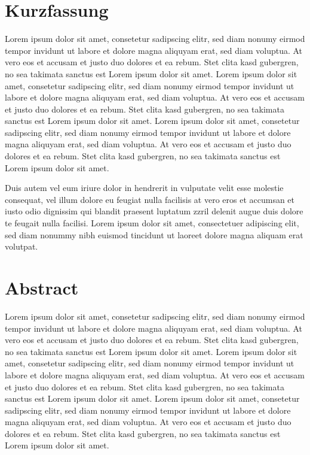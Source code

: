 
\pagestyle{empty}

\chapter*{Kurzfassung}	%
Lorem ipsum dolor sit amet, consetetur sadipscing elitr, sed diam nonumy eirmod tempor invidunt ut labore et dolore magna aliquyam erat, sed diam voluptua. At vero eos et accusam et justo duo dolores et ea rebum. Stet clita kasd gubergren, no sea takimata sanctus est Lorem ipsum dolor sit amet. Lorem ipsum dolor sit amet, consetetur sadipscing elitr, sed diam nonumy eirmod tempor invidunt ut labore et dolore magna aliquyam erat, sed diam voluptua. At vero eos et accusam et justo duo dolores et ea rebum. Stet clita kasd gubergren, no sea takimata sanctus est Lorem ipsum dolor sit amet. Lorem ipsum dolor sit amet, consetetur sadipscing elitr, sed diam nonumy eirmod tempor invidunt ut labore et dolore magna aliquyam erat, sed diam voluptua. At vero eos et accusam et justo duo dolores et ea rebum. Stet clita kasd gubergren, no sea takimata sanctus est Lorem ipsum dolor sit amet.   

Duis autem vel eum iriure dolor in hendrerit in vulputate velit esse molestie consequat, vel illum dolore eu feugiat nulla facilisis at vero eros et accumsan et iusto odio dignissim qui blandit praesent luptatum zzril delenit augue duis dolore te feugait nulla facilisi. Lorem ipsum dolor sit amet, consectetuer adipiscing elit, sed diam nonummy nibh euismod tincidunt ut laoreet dolore magna aliquam erat volutpat.   

\newpage
\chapter*{Abstract} %
Lorem ipsum dolor sit amet, consetetur sadipscing elitr, sed diam nonumy eirmod tempor invidunt ut labore et dolore magna aliquyam erat, sed diam voluptua. At vero eos et accusam et justo duo dolores et ea rebum. Stet clita kasd gubergren, no sea takimata sanctus est Lorem ipsum dolor sit amet. Lorem ipsum dolor sit amet, consetetur sadipscing elitr, sed diam nonumy eirmod tempor invidunt ut labore et dolore magna aliquyam erat, sed diam voluptua. At vero eos et accusam et justo duo dolores et ea rebum. Stet clita kasd gubergren, no sea takimata sanctus est Lorem ipsum dolor sit amet. Lorem ipsum dolor sit amet, consetetur sadipscing elitr, sed diam nonumy eirmod tempor invidunt ut labore et dolore magna aliquyam erat, sed diam voluptua. At vero eos et accusam et justo duo dolores et ea rebum. Stet clita kasd gubergren, no sea takimata sanctus est Lorem ipsum dolor sit amet.   

